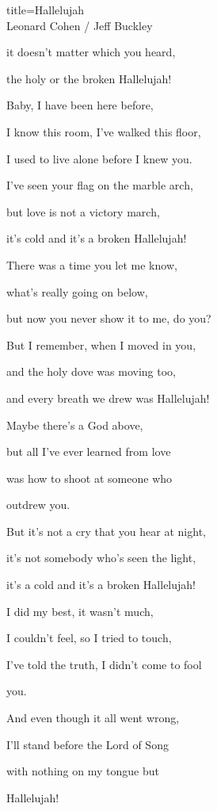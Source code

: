 \begin{song}{title=\predtitle\centering Hallelujah \\\large Leonard Cohen / Jeff Buckley \vspace*{-0.3cm}}
{\begin{centerjustified}
\begin{varwidth}[t]{0.48\textwidth}
	it doesn't matter which you heard,

	the holy or the broken Hallelujah!





\end{varwidth}\mezisloupci\begin{varwidth}[t]{0.5\textwidth}\setlength{\parindent}{0.45cm}  %
\vspace*{0.375cm}
\sloka
	Baby, I have been here before,

	I know this room, I've walked this floor,

	I used to live alone before I knew you.

	I've seen your flag on the marble arch,

	but love is not a victory march,

	it's cold and it's a broken Hallelujah!


\sloka
	There was a time you let me know,

	what's really going on below,
	
	but now you never show it to me, do you?

	But I remember, when I moved in you,

	and the holy dove was moving too,

	and every breath we drew was Hallelujah!


\sloka
	Maybe there's a God above,
	
	but all I've ever learned from love
	
	was how to shoot at someone who

	outdrew you.

	But it's not a cry that you hear at night,

	it's not somebody who's seen the light,

	it's a cold and it's a broken Hallelujah!

\sloka
	I did my best, it wasn't much,

	I couldn't feel, so I tried to touch,

	I've told the truth, I didn't come to fool

	you.

	And even though it all went wrong,

	I'll stand before the Lord of Song

	with nothing on my tongue but

	Hallelujah!


\end{varwidth}   %

\end{centerjustified}
}
\setcounter{Slokočet}{0}
\end{song}
